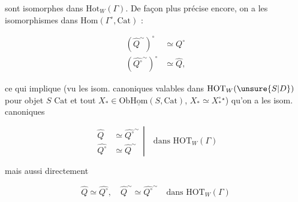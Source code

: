 
 sont isomorphes dans $\mathrm{Hot}_W(\Gamma)$. De façon plus précise encore, on a les isomorphismes dans \uline{$\mathrm{Hom}$}$(\Gamma^\circ,\mathrm{Cat})$ :

\[
\begin{aligned}
(\widehat Q^{\sim})^\circ &\simeq \widehat{Q^\circ}\\
(\widehat{Q^\circ}^{\sim})^\circ &\simeq \widehat Q,
\end{aligned}
\]


ce qui implique (vu les isom. canoniques valables dans $\mathrm{HOT}_W(\unsure{S|D})$ pour  objet $S$  $\mathrm{Cat}$ et tout $X_*\in\mathrm{Ob}\underline{\mathrm{Hom}}(S,\mathrm{Cat})$, $X_*\simeq X_*^\circ$${}^{\star}$) qu'on a les isom. canoniques

\[
\left.\begin{aligned}
\widehat Q&\simeq\widehat{Q^\circ}^{\sim}\\
\widehat{Q^\circ}&\simeq\widehat Q^{\sim}
\end{aligned}\right|\quad\text{dans }\mathrm{HOT}_W(\Gamma)
\]

mais aussi directement

\[
\widehat Q\simeq\widehat{Q^\circ},\quad \widehat Q^{\sim}\simeq\widehat{Q^\circ}^{\sim}\quad\text{dans }\mathrm{HOT}_W(\Gamma)
\]
